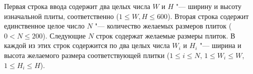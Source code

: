 Первая строка ввода содержит два целых числа $W$ и $H$ "--- ширину и высоту
изначальной плиты, соответственно ($1 \le W, H \le 600$).
Вторая строка содержит единственное целое число $N$ "--- количество желаемых
размеров плиток ($0 < N \le 200$).
Следующие $N$ строк содержат желаемые размеры плиток.
В каждой из этих строк содержится по два целых числа $W_i$ и $H_i$ "--- ширина
и высота желаемого размера соответствующей плитки
($1 \le i \le N$, $1 \le W_i \le W$, $1 \le H_i \le H$).

